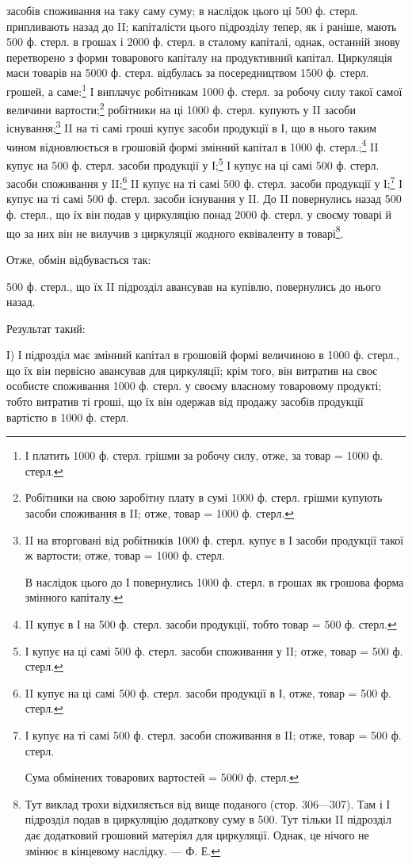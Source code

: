 \parcont{}  %
засобів споживання на таку саму суму; в наслідок цього ці 500 ф. стерл.
припливають назад до II; капіталісти цього підрозділу тепер, як і раніше,
мають 500 ф. стерл. в грошах і 2000 ф. стерл. в сталому капіталі,
однак, останній знову перетворено з форми товарового капіталу на продуктивний
капітал. Циркуляція маси товарів на 5000 ф. стерл. відбулась
за посередництвом 1500 ф. стерл. грошей, а саме:\footnote{
І платить 1000 ф. стерл. грішми за робочу силу, отже, за товар
= 1000 ф. стерл.
} І виплачує робітникам
1000 ф. стерл. за робочу силу такої самої величини вартости;\footnote{
Робітники на свою заробітну плату в сумі 1000 ф. стерл. грішми
купують засоби споживання в II; отже, товар = 1000 ф. стерл.
} робітники на ці 1000 ф. стерл. купують у II засоби існування;\footnote{
II на вторговані від робітників 1000 ф. стерл. купує в І засоби
продукції такої ж вартости; отже, товар = 1000 ф. стерл.

В наслідок цього до І повернулись 1000 ф. стерл. в грошах як грошова
форма змінного капіталу.
} II на ті самі гроші купує засоби продукції в І, що в нього таким
чином відновлюється в грошовій формі змінний капітал в 1000 ф. стерл.;\footnote{
II купує в І на 500 ф. стерл. засоби продукції, тобто товар =
500 ф. стерл.
} II купує на 500 ф. стерл. засоби продукції у І;\footnote{
І купує на ці самі 500 ф. стерл. засоби споживання у II; отже,
товар = 500 ф. стерл.
} І купує на ці
самі 500 ф. стерл. засоби споживання у II;\footnote{
II купує на ці самі 500 ф. стерл. засоби продукції в І, отже,
товар = 500 ф. стерл.
} II купує на ті самі 500 ф.
стерл. засоби продукції у І;\footnote{
І купує на ті самі 500 ф. стерл. засоби споживання в II; отже,
товар = 500 ф. стерл.

Сума обмінених товарових вартостей = 5000 ф. стерл.
} І купує на ті самі 500 ф. стерл. засоби
існування у II. До II повернулись назад 500 ф. стерл., що їх він подав у
циркуляцію понад 2000 ф. стерл. у своєму товарі й що за них він не
вилучив з циркуляції жодного еквіваленту в товарі\footnote{
Тут виклад трохи відхиляється від вище поданого (стор. 306—307). Там і
І підрозділ подав в циркуляцію додаткову суму в 500. Тут тільки II підрозділ дає
додатковий грошовий матеріял для циркуляції. Однак, це нічого не змінює в
кінцевому наслідку. — Ф. Е.
}.

Отже, обмін відбувається так:

500 ф. стерл., що їх II підрозділ авансував на купівлю, повернулись
до нього назад.

Результат такий:

І) І підрозділ має змінний капітал в грошовій формі величиною в 1000 ф.
стерл., що їх він первісно авансував для циркуляції; крім того, він витратив
на своє особисте споживання 1000 ф. стерл. у своєму власному
товаровому продукті; тобто витратив ті гроші, що їх він одержав від продажу
засобів продукції вартістю в 1000 ф. стерл.
